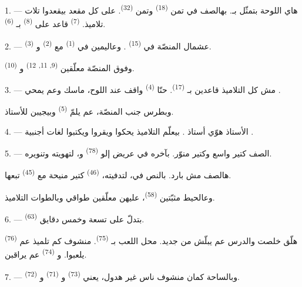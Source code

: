 \VUsaut{3.0mm}

1. --- هاي اللوحة بتمثّل  بـ. بهالصف في تمن
 \textsuperscript{(18)} وتمن 
\textsuperscript{(32)}. على كل مقعد بيقعدوا تلات تلاميذ.
 \textsuperscript{(7)} قاعد على 
\textsuperscript{(8)} بـ \textsuperscript{(6)}.

2. --- عشمال المنصّة في  \textsuperscript{(15)}
. وعاليمين في 
\textsuperscript{(1)} مع  \textsuperscript{(2)}
و \textsuperscript{(3)}.

وفوق المنصّة معلّقين  \textsuperscript{(9, 11,}
\textsuperscript{12)} و \textsuperscript{(10)}.

3. --- مش كل التلاميذ قاعدين بـ \textsuperscript{(17)}.
حنّا \textsuperscript{(4)} واقف عند اللوح، ماسك 
وعم يمحي .

وبطرس جنب المنصّة، عم يلمّ  \textsuperscript{(5)}
وبيجيبن للأستاذ.

4. ---  الأستاذ هوّي أستاذ . بيعلّم
التلاميذ يحكوا ويقروا ويكتبوا لغات أجنبية .

5. --- الصف كتير واسع وكتير منوّر. بآخره في  عريض إلو
 \textsuperscript{(78)} و،
لتهويته وتنويره.

هالصف مش بارد. بالنص في، لتدفيته،  \textsuperscript{(46)}
كتير منيحة مع  \textsuperscript{(45)} تبعها.

وعالحيط مثبّتين  \textsuperscript{(58)}، عليهن معلّقين
طواقي وبالطوات التلاميذ.

\VUsaut{5.2mm}
\VUsaut{3.6mm}

6. ---  \textsuperscript{(63)} بتدلّ على تسعة وخمس دقايق.

 \textsuperscript{(76)} هلّق خلصت والدرس عم يبلّش من جديد.
محل اللعب بـ \textsuperscript{(75)}. منشوف كم تلميذ عم
يلعبوا. و \textsuperscript{(74)} عم يراقبن.

7. --- وبالساحة كمان منشوف ناس غير هدول، يعني 
\textsuperscript{(73)} و \textsuperscript{(71)}
و \textsuperscript{(72)}.

